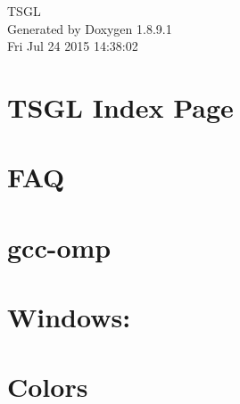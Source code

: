 \documentclass[twoside]{book}
\newcommand{\+}{\discretionary{\mbox{\scriptsize$\hookleftarrow$}}{}{}}
\newcommand{\clearemptydoublepage}{%
  \newpage{\pagestyle{empty}\cleardoublepage}%
}
\begin{document}
\hypersetup{pageanchor=false,
             bookmarks=true,
             bookmarksnumbered=true,
             pdfencoding=unicode
            }
\begin{titlepage}
\vspace*{7cm}
\begin{center}%
{\Large T\+S\+G\+L }\\
\vspace*{1cm}
{\large Generated by Doxygen 1.8.9.1}\\
\vspace*{0.5cm}
{\small Fri Jul 24 2015 14:38:02}\\
\end{center}
\end{titlepage}
\clearemptydoublepage
\tableofcontents
\clearemptydoublepage
{}
\hypersetup{pageanchor=true}

\chapter{T\+S\+G\+L Index Page}
\label{index}\hypertarget{index}{}
\chapter{F\+A\+Q}
\label{md__home_pretzel_workspace_tsgl__t_s_g_l_docs-src_faq}
\hypertarget{md__home_pretzel_workspace_tsgl__t_s_g_l_docs-src_faq}{}

\chapter{gcc-\/omp}
\label{md__home_pretzel_workspace_tsgl__t_s_g_l_docs-src_gcc-omp}
\hypertarget{md__home_pretzel_workspace_tsgl__t_s_g_l_docs-src_gcc-omp}{}

\chapter{Windows\+:}
\label{md__home_pretzel_workspace_tsgl__t_s_g_l_docs-src_library-versions}
\hypertarget{md__home_pretzel_workspace_tsgl__t_s_g_l_docs-src_library-versions}{}

\chapter{Colors}
\label{md__home_pretzel_workspace_tsgl__t_s_g_l_docs-src_tutorials_colors}
\hypertarget{md__home_pretzel_workspace_tsgl__t_s_g_l_docs-src_tutorials_colors}{}

\end{document}
